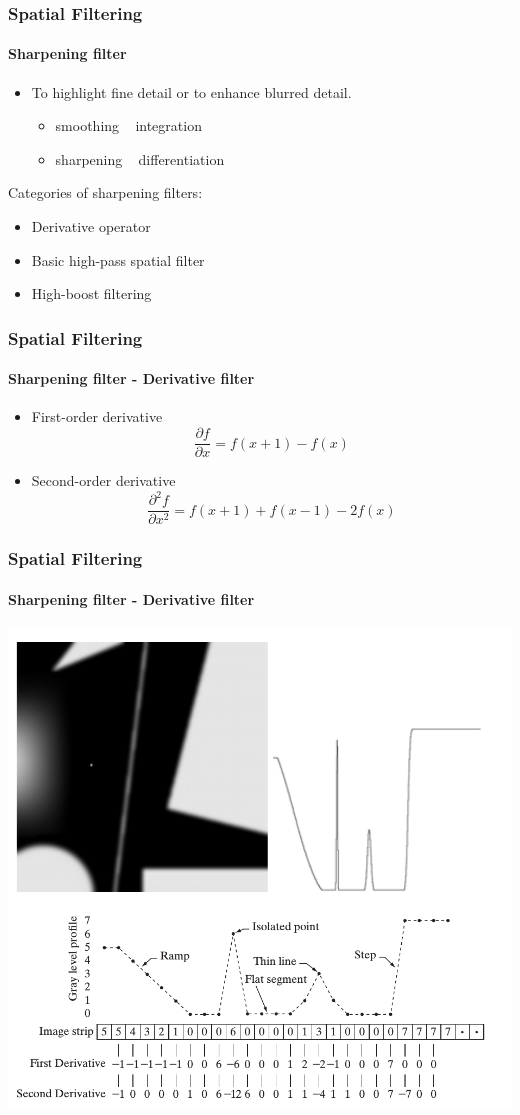 \documentclass{beamer}
\begin{document}
\begin{frame}
\frametitle{Spatial Filtering}
\framesubtitle{Sharpening filter}
\begin{itemize}
\item To highlight fine detail or to enhance blurred detail. 
\begin{itemize}
\item smoothing ~ integration
\item sharpening ~ differentiation
\end{itemize}
\end{itemize}
\begin{block}{ Categories of sharpening filters: }
\begin{itemize}
\item Derivative operator 
\item Basic high-pass spatial filter 
\item High-boost filtering 
\end{itemize}
\end{block}
\end{frame}
\begin{frame}
\frametitle{Spatial Filtering}
\framesubtitle{Sharpening filter - Derivative filter}
\begin{itemize}
\item First-order derivative 
$$\frac{\partial f}{\partial x} = f(x+1) - f(x)$$
\item Second-order derivative 
$$\frac{\partial^{2}f}{\partial x^{2}} = f(x+1)+f(x-1) - 2f(x)$$
\end{itemize}
\end{frame}
\begin{frame}
\frametitle{Spatial Filtering}
\framesubtitle{Sharpening filter - Derivative filter}
\begin{center}
\includegraphics[scale=0.3]{images/Spatial7-derivative.png}
\end{center}		
\end{frame}
\end{document}
